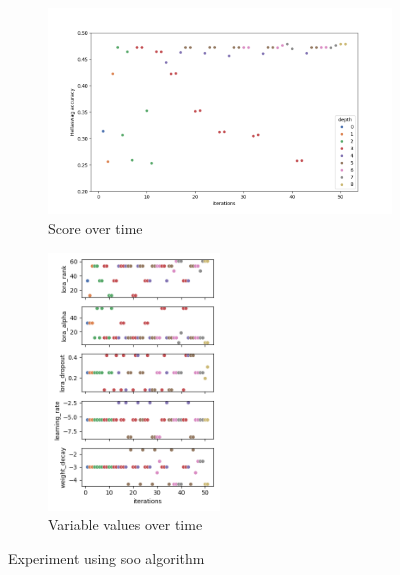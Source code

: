 \begin{figure}[h!]
    \centering
    \begin{subfigure}[b]{.5\textwidth}
      \centering
      \includegraphics[width = \textwidth]{assets/img/chap_4/experiments/plots/soo/score_evolution.png}
      \caption{Score over time}
      \label{fig:soo_score_time}
    \end{subfigure}%
    \begin{subfigure}[b]{.4\textwidth}
      \centering
      \includegraphics[width = 0.5\textwidth]{assets/img/chap_4/experiments/plots/soo/variables_evolution.png}
      \caption{Variable values over time}
      \label{fig:soo_var_time}
    \end{subfigure}
    \caption{Experiment using \acrshort{soo} algorithm}
    \label{fig:soo_res}
\end{figure}


